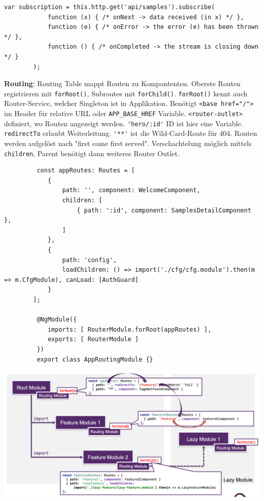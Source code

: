 \documentclass[10pt,landscape]{article}
\begin{document}
\begin{multicols}{2}
        \begin{lstlisting}[belowskip=-0.8 \baselineskip]
        var subscription = this.http.get('api/samples').subscribe(
            function (x) { /* onNext -> data received (in x) */ },
            function (e) { /* onError -> the error (e) has been thrown */ },
            function () { /* onCompleted -> the stream is closing down */ }
        );
        \end{lstlisting}

        \textbf{Routing}: Routing Table mappt Routen zu Kompontenten.
        Oberste Routen registrieren mit \lstinline{forRoot()}, Subroutes mit \lstinline{forChild()}.
        \lstinline{forRoot()} kennt auch Router-Service, welcher Singleton ist in Applikation.
        Benötigt \lstinline{<base href="/">} im Header für relative URL oder \lstinline{APP_BASE_HREF} Variable.
        \lstinline{<router-outlet>} definiert, wo Routen angezeigt werden.
        \lstinline{'hero/:id'} ID ist hier eine Variable.
        \lstinline{redirectTo} erlaubt Weiterleitung.
        \lstinline{'**'} ist die Wild-Card-Route für 404.
        Routen werden aufgelöst nach "first come first served".
        Verschachtelung möglich mittels \lstinline{children}, Parent benötigt dann weiteres Router Outlet.

        \begin{lstlisting}
         const appRoutes: Routes = [
            {
                path: '', component: WelcomeComponent,
                children: [
                    { path: ':id', component: SamplesDetailComponent },
                ]
            },
            {
                path: 'config',
                loadChildren: () => import('./cfg/cfg.module').then(m => m.CfgModule), canLoad: [AuthGuard]
            }
        ];

         @NgModule({
            imports: [ RouterModule.forRoot(appRoutes) ],
            exports: [ RouterModule ]
         })
         export class AppRoutingModule {}
         \end{lstlisting}

        \includegraphics[width=\linewidth]{angular_routing}


\end{multicols}
\end{document}
